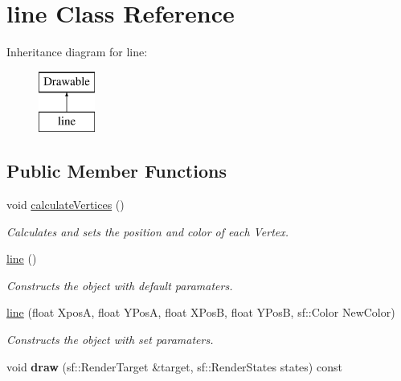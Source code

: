 \hypertarget{classline}{}\section{line Class Reference}
\label{classline}
Inheritance diagram for line\+:\begin{figure}[H]
\begin{center}
\leavevmode
\includegraphics[height=2.000000cm]{classline}
\end{center}
\end{figure}
\subsection*{Public Member Functions}
\begin{DoxyCompactItemize}
\item 
\mbox{\label{classline_a0b04699a018fa489119b3f7b98ecad60}} 
void \mbox{\hyperlink{classline_a0b04699a018fa489119b3f7b98ecad60}{calculate\+Vertices}} ()
\begin{DoxyCompactList}\small\item\em Calculates and sets the position and color of each Vertex. \end{DoxyCompactList}\item 
\mbox{\label{classline_a854d4e37d6dc6af1c7cd08cb801c6c26}} 
\mbox{\hyperlink{classline_a854d4e37d6dc6af1c7cd08cb801c6c26}{line}} ()
\begin{DoxyCompactList}\small\item\em Constructs the object with default paramaters. \end{DoxyCompactList}\item 
\mbox{\hyperlink{classline_a86e47bbc81b214314dd46e20e4bd2d8b}{line}} (float XposA, float Y\+PosA, float X\+PosB, float Y\+PosB, sf\+::\+Color New\+Color)
\begin{DoxyCompactList}\small\item\em Constructs the object with set paramaters. \end{DoxyCompactList}\item 
\mbox{\label{classline_ad439ea0b0f3df62fc3dc4a3a65c1ed9a}} 
void {\bfseries draw} (sf\+::\+Render\+Target \&target, sf\+::\+Render\+States states) const
\end{DoxyCompactItemize}


